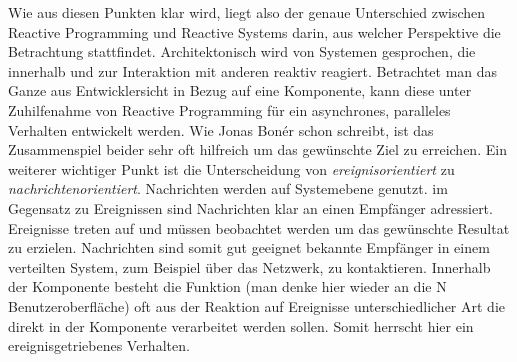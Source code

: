 Wie aus diesen Punkten klar wird, liegt also der genaue Unterschied zwischen Reactive Programming und Reactive Systems darin, aus welcher Perspektive die Betrachtung stattfindet. Architektonisch wird von Systemen gesprochen, die innerhalb und zur Interaktion mit anderen reaktiv reagiert. Betrachtet man das Ganze aus Entwicklersicht in Bezug auf eine Komponente, kann diese unter Zuhilfenahme von Reactive Programming für ein asynchrones, paralleles Verhalten entwickelt werden. Wie Jonas Bonér schon schreibt, ist das Zusammenspiel beider sehr oft hilfreich um das gewünschte Ziel zu erreichen. Ein weiterer wichtiger Punkt ist die Unterscheidung von \textit{ereignisorientiert} zu \textit{nachrichtenorientiert}. Nachrichten werden auf Systemebene genutzt. im Gegensatz zu Ereignissen sind Nachrichten klar an einen Empfänger adressiert. Ereignisse treten auf und müssen beobachtet werden um das gewünschte Resultat zu erzielen. Nachrichten sind somit gut geeignet bekannte Empfänger in einem verteilten System, zum Beispiel über das Netzwerk, zu kontaktieren. Innerhalb der Komponente besteht die Funktion (man denke hier wieder an die N
Benutzeroberfläche) oft aus der Reaktion auf Ereignisse unterschiedlicher Art die direkt in der Komponente verarbeitet werden sollen. Somit herrscht hier ein ereignisgetriebenes Verhalten. 

